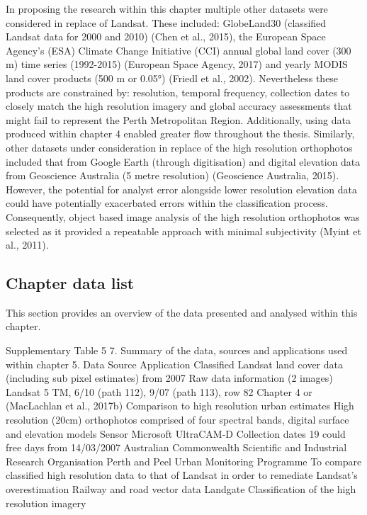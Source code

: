 \documentclass[]{book}
\begin{document}
In proposing the research within this chapter multiple other datasets
were considered in replace of Landsat. These included: GlobeLand30
(classified Landsat data for 2000 and 2010) (Chen et al., 2015), the
European Space Agency's (ESA) Climate Change Initiative (CCI) annual
global land cover (300 m) time series (1992-2015) (European Space
Agency, 2017) and yearly MODIS land cover products (500 m or 0.05°)
(Friedl et al., 2002). Nevertheless these products are constrained by:
resolution, temporal frequency, collection dates to closely match the
high resolution imagery and global accuracy assessments that might fail
to represent the Perth Metropolitan Region. Additionally, using data
produced within chapter 4 enabled greater flow throughout the thesis.
Similarly, other datasets under consideration in replace of the high
resolution orthophotos included that from Google Earth (through
digitisation) and digital elevation data from Geoscience Australia (5
metre resolution) (Geoscience Australia, 2015). However, the potential
for analyst error alongside lower resolution elevation data could have
potentially exacerbated errors within the classification process.
Consequently, object based image analysis of the high resolution
orthophotos was selected as it provided a repeatable approach with
minimal subjectivity (Myint et al., 2011).

\subsection{Chapter data list}\label{chapter-data-list-1}

This section provides an overview of the data presented and analysed
within this chapter.

Supplementary Table 5 7. Summary of the data, sources and applications
used within chapter 5. Data Source Application Classified Landsat land
cover data (including sub pixel estimates) from 2007 Raw data
information (2 images) Landsat 5 TM, 6/10 (path 112), 9/07 (path 113),
row 82 Chapter 4 or (MacLachlan et al., 2017b) Comparison to high
resolution urban estimates High resolution (20cm) orthophotos comprised
of four spectral bands, digital surface and elevation models Sensor
Microsoft UltraCAM-D Collection dates 19 could free days from 14/03/2007
Australian Commonwealth Scientific and Industrial Research Organisation
Perth and Peel Urban Monitoring Programme To compare classified high
resolution data to that of Landsat in order to remediate Landsat's
overestimation Railway and road vector data Landgate Classification of
the high resolution imagery
\end{document}
